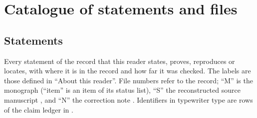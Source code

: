 \section{Catalogue of statements and files}\label{app:catalogue}

\subsection{Statements}

Every statement of the record that this reader states, proves, reproduces or locates, with where it is in the record and how far it was checked. The labels are those defined in ``About this reader''. File numbers refer to the record; ``M'' is the monograph  (``item'' is an item of its status list), ``S'' the reconstructed source manuscript , and ``N'' the correction note . Identifiers in typewriter type are rows of the claim ledger in .


